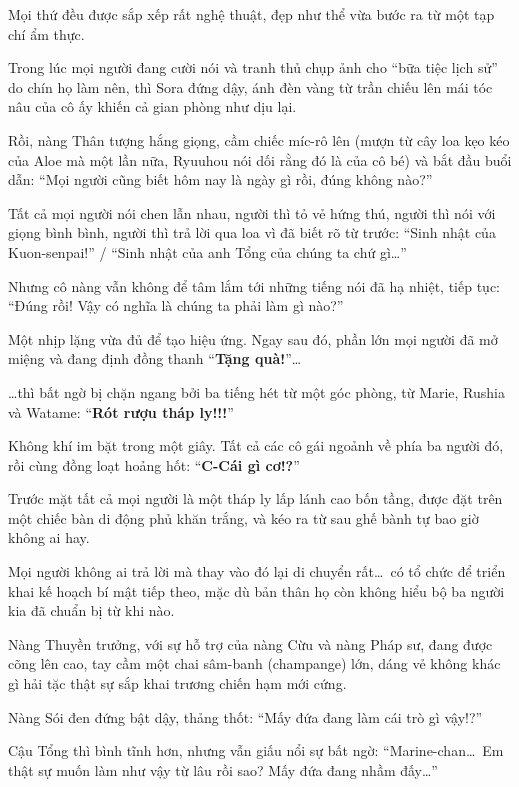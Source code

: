 \documentclass[../main.tex]{subfiles}
\begin{document}
Mọi thứ đều được sắp xếp rất nghệ thuật, đẹp như thể vừa bước ra từ một tạp chí ẩm thực.

Trong lúc mọi người đang cười nói và tranh thủ chụp ảnh cho ``bữa tiệc lịch sử'' do chín họ làm nên, thì Sora đứng dậy, ánh đèn vàng từ trần chiếu lên mái tóc nâu của cô ấy khiến cả gian phòng như dịu lại.

Rồi, nàng Thân tượng hắng giọng, cầm chiếc míc-rô lên (mượn từ cây loa kẹo kéo của Aloe mà một lần nữa, Ryuuhou nói dối rằng đó là của cô bé) và bắt đầu buổi dẫn: ``Mọi người cũng biết hôm nay là ngày gì rồi, đúng không nào?''

Tất cả mọi người nói chen lẫn nhau, người thì tỏ vẻ hứng thú, người thì nói với giọng bình bình, người thì trả lời qua loa vì đã biết rõ từ trước: ``Sinh nhật của Kuon-senpai!'' / ``Sinh nhật của anh Tổng của chúng ta chứ gì\dots''

Nhưng cô nàng vẫn không để tâm lắm tới những tiếng nói đã hạ nhiệt, tiếp tục: ``Đúng rồi! Vậy có nghĩa là chúng ta phải làm gì nào?''

Một nhịp lặng vừa đủ để tạo hiệu ứng. Ngay sau đó, phần lớn mọi người đã mở miệng và đang định đồng thanh ``\textbf{Tặng quà!}''\dots

\dots thì bất ngờ bị chặn ngang bởi ba tiếng hét từ một góc phòng, từ Marie, Rushia và Watame: ``\textbf{Rót rượu tháp ly!!!}''

Không khí im bặt trong một giây. Tất cả các cô gái ngoảnh về phía ba người đó, rồi cùng đồng loạt hoảng hốt: ``\textbf{C-Cái gì cơ!?}''

Trước mặt tất cả mọi người là một tháp ly lấp lánh cao bốn tầng, được đặt trên một chiếc bàn di động phủ khăn trắng, và kéo ra từ sau ghế bành tự bao giờ không ai hay.

Mọi người không ai trả lời mà thay vào đó lại di chuyển rất\dots\ có tổ chức để triển khai kế hoạch bí mật tiếp theo, mặc dù bản thân họ còn không hiểu bộ ba người kia đã chuẩn bị từ khi nào.

Nàng Thuyền trưởng, với sự hỗ trợ của nàng Cừu và nàng Pháp sư, đang được cõng lên cao, tay cầm một chai sâm-banh (champange) lớn, dáng vẻ không khác gì hải tặc thật sự sắp khai trương chiến hạm mới cứng.

Nàng Sói đen đứng bật dậy, thảng thốt: ``Mấy đứa đang làm cái trò gì vậy!?''

Cậu Tổng thì bình tĩnh hơn, nhưng vẫn giấu nổi sự bất ngờ: ``Marine-chan\dots\ Em thật sự muốn làm như vậy từ lâu rồi sao? Mấy đứa đang nhầm đấy\dots''
\end{document}
